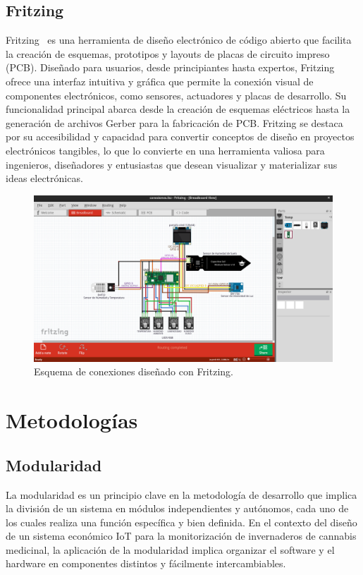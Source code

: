 \subsection{Fritzing}
Fritzing~\cite{misc:Fritzing} es una herramienta de diseño electrónico de código abierto que facilita la creación de esquemas, prototipos y layouts de placas de circuito impreso (PCB). Diseñado para usuarios, desde principiantes hasta expertos, Fritzing ofrece una interfaz intuitiva y gráfica que permite la conexión visual de componentes electrónicos, como sensores, actuadores y placas de desarrollo. Su funcionalidad principal abarca desde la creación de esquemas eléctricos hasta la generación de archivos Gerber para la fabricación de PCB. Fritzing se destaca por su accesibilidad y capacidad para convertir conceptos de diseño en proyectos electrónicos tangibles, lo que lo convierte en una herramienta valiosa para ingenieros, diseñadores y entusiastas que desean visualizar y materializar sus ideas electrónicas.
\begin{figure}[h]
    \centering
    \includegraphics[width=1\textwidth]{img/herramientas/fritzing.png}
    \caption{Esquema de conexiones diseñado con Fritzing.}
\end{figure}

\section{Metodologías}
\subsection{Modularidad}
La modularidad es un principio clave en la metodología de desarrollo que implica la división de un sistema en módulos independientes y autónomos, cada uno de los cuales realiza una función específica y bien definida. En el contexto del diseño de un sistema económico IoT para la monitorización de invernaderos de cannabis medicinal, la aplicación de la modularidad implica organizar el software y el hardware en componentes distintos y fácilmente intercambiables.

